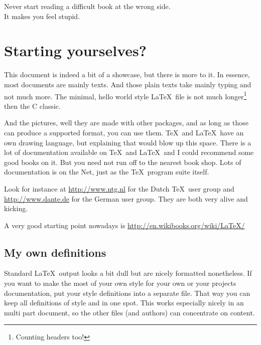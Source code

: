 \def\TheFile{ch07_poser.tex}
\begin{savequote}[15cm]
  \vspace{-30mm}
  \raggedleft
  \sffamily
  Never start reading a difficult book at the wrong side.\\ 
  It makes you feel stupid.
\end{savequote}
\chapter{Starting yourselves?} 


This document is indeed a bit of a showcase, but there is more to it.
In essence, most documents are mainly texts. 
And those plain texts take mainly typing and not much more.
The minimal, hello world style \LaTeX\ file is not much 
longer\footnote{Counting headers too!} then the C classic.


And the pictures, well they are made with other packages, and as long
as those can produce a supported format, you can use them. \TeX\ and
\LaTeX\ have an own drawing language, but explaining that would blow
up this space.
There is a lot of documentation available on \TeX\ and \LaTeX\ and I
could recommend some good books on it.
But you need not run off to the nearest book shop. Lots of
documentation is on the Net, just as the \TeX\ program suite itself. 

Look for instance at \url{http://www.ntg.nl} for the Dutch \TeX\ user group
and \url{http://www.dante.de} for the German user group. They are both very 
alive and kicking.

A very good starting point nowadays is \url{http://en.wikibooks.org/wiki/LaTeX/}

\section{My own definitions}
Standard \LaTeX\ output looks a bit dull but are nicely formatted nonetheless.
If you want to make the most of your own style for your own or your
projects documentation, put your style definitions into a separate
file. That way you can keep all definitions of style and  in one
spot. This works especially nicely in an multi part document, so
the other files (and authors) can concentrate on content.


